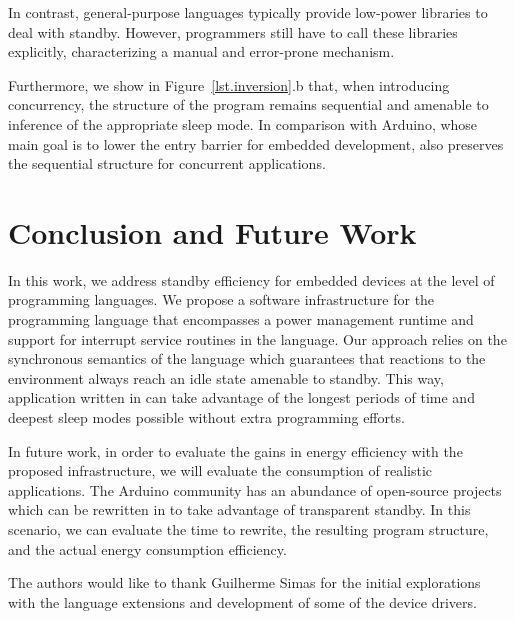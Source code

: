 In contrast, general-purpose languages typically provide low-power libraries to
deal with standby.
However, programmers still have to call these libraries explicitly,
characterizing a manual and error-prone mechanism.

Furthermore, we show in Figure~\ref{lst.inversion}.b that, when introducing
concurrency, the structure of the program remains sequential and amenable to
inference of the appropriate sleep mode.
In comparison with Arduino, whose main goal is to lower the entry barrier for
embedded development, \CEU also preserves the sequential structure for
concurrent applications.

\section{Conclusion and Future Work}
\label{sec.conclusion}

In this work, we address standby efficiency for embedded devices at the level
of programming languages.
%
We propose a software infrastructure for the programming language \CEU that
encompasses a power management runtime and support for interrupt service
routines in the language.
%
Our approach relies on the synchronous semantics of the language which
guarantees that reactions to the environment always reach an idle state
amenable to standby.
%
This way, application written in \CEU can take advantage of the longest periods
of time and deepest sleep modes possible without extra programming efforts.

In future work, in order to evaluate the gains in energy efficiency with the
proposed infrastructure, we will evaluate the consumption of realistic
applications.
%
The Arduino community has an abundance of open-source projects which can be
rewritten in \CEU to take advantage of transparent standby.
%
In this scenario, we can evaluate the time to rewrite, the resulting program
structure, and the actual energy consumption efficiency.

\begin{acks}
The authors would like to thank Guilherme Simas for the initial explorations
with the language extensions and development of some of the device drivers.
\end{acks}
